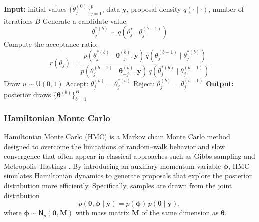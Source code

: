 \begin{algorithm}[H]
\caption{Metropolis–Hastings (MH)}
\begin{algorithmic}
\State \textbf{Input:} initial values $\{\theta_j^{(0)}\}_{j=1}^p$, data $\bm{y}$, proposal density $q(\cdot\mid\cdot)$, number of iterations $B$
    \State Generate a candidate value:
    \[
      \theta_j^{*(b)} \sim q\!\left(\theta_j^{*}\mid\theta_j^{(b-1)}\right)
    \]
    \State Compute the acceptance ratio:
    \[
      r(\theta_j) = 
      \frac{
        p\!\left(\theta_j^{*(b)} \mid \bm{\theta}_{-j}^{(b)},\bm{y}\right)\,
        q\!\left(\theta_j^{(b-1)}\mid\theta_j^{*(b)}\right)
      }{
        p\!\left(\theta_j^{(b-1)} \mid \bm{\theta}_{-j}^{(b)},\bm{y}\right)\,
        q\!\left(\theta_j^{*(b)}\mid\theta_j^{(b-1)}\right)
      }
    \]
    \State Draw $u \sim \mathsf{U}(0,1)$
      \State Accept: $\theta_j^{(b)} = \theta_j^{*(b)}$
    \Else
      \State Reject: $\theta_j^{(b)} = \theta_j^{(b-1)}$
    \EndIf
  \EndFor
\EndFor
\State \textbf{Output:} posterior draws $\{\bm{\theta}^{(b)}\}_{b=1}^B$
\end{algorithmic}
\end{algorithm}

\subsubsection{Hamiltonian Monte Carlo}

Hamiltonian Monte Carlo (HMC) is a Markov chain Monte Carlo method designed to overcome the limitations of random--walk behavior and slow convergence that often appear in classical approaches such as Gibbs sampling and Metropolis–Hastings \cite{GELMAN14}. By introducing an auxiliary momentum variable $\bm{\phi}$, HMC simulates Hamiltonian dynamics to generate proposals that explore the posterior distribution more efficiently. Specifically, samples are drawn from the joint distribution
\begin{equation}
p(\bm{\theta},\bm{\phi}\mid\bm{y}) = p(\bm{\phi})\,p(\bm{\theta}\mid\bm{y}),
\end{equation}
where $\bm{\phi}\sim \mathsf{N}_p(\bm{0},\bm{M})$ with mass matrix $\bm{M}$ of the same dimension as $\bm{\theta}$.


